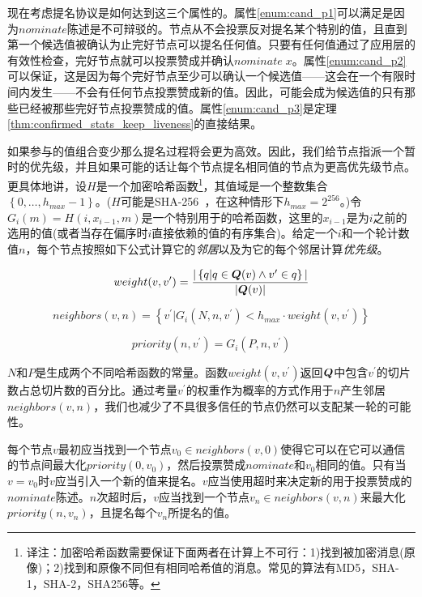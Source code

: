 现在考虑提名协议是如何达到这三个属性的。属性\ref{enum:cand_p1}可以满足是因为$nominate$陈述是不可辩驳的。节点从不会投票反对提名某个特别的值，且直到第一个候选值被确认为止完好节点可以提名任何值。只要有任何值通过了应用层的有效性检查，完好节点就可以投票赞成并确认$nominate\;x$。属性\ref{enum:cand_p2}可以保证，这是因为每个完好节点至少可以确认一个候选值——这会在一个有限时间内发生——不会有任何节点投票赞成新的值。因此，可能会成为候选值的只有那些已经被那些完好节点投票赞成的值。属性\ref{enum:cand_p3}是定理\ref{thm:confirmed_stats_keep_liveness}的直接结果。

如果参与的值组合变少那么提名过程将会更为高效。因此，我们给节点指派一个暂时的优先级，并且如果可能的话让每个节点提名相同值的节点为更高优先级节点。更具体地讲，设$H$是一个加密哈希函数{\footnote{译注：加密哈希函数需要保证下面两者在计算上不可行：1)找到被加密消息(原像)；2)找到和原像不同但有相同哈希值的消息。常见的算法有MD5，SHA-1，SHA-2，SHA256等。}}，其值域是一个整数集合$\left\{0,\dots,h_{max}-1\right\}$。($H$可能是SHA-256~\cite{shs2015}，在这种情形下$h_{max}=2^{256}$。)令$G_i(m)=H(i, x_{i-1},m)$是一个特别用于{\slot}的哈希函数，这里的$x_{i-1}$是为$i$之前的{\slot}选用的值(或者当{\slot}存在偏序时{\slot}$i$直接依赖的值的有序集合)。给定一个{\slot}$i$和一个轮计数值$n$，每个节点按照如下公式计算它的\textit{邻居}以及为它的每个邻居计算\textit{优先级}。

\begin{equation*}
	weight(v,v^{\prime}) = \frac{|\left\{q|q\in{\bm Q}(v)\wedge v^{\prime}\in q\right\}|}{|{\bm Q}(v)|}
\end{equation*}

\begin{equation*}
	neighbors(v,n) = \left\{v^{\prime}|G_i(N,n,v^{\prime})<h_{max}\cdot weight(v,v^{\prime})\right\}
\end{equation*}

\begin{equation*}
	priority(n,v^{\prime}) = G_i(P,n,v^{\prime})
\end{equation*}

$N$和$P$是生成两个不同哈希函数的常量。函数$weight(v,v^{\prime})$返回${\bm Q}$中包含$v^{\prime}$的切片数占总切片数的百分比。通过考量$v^{\prime}$的权重作为概率的方式作用于$n$产生邻居$neighbors(v,n)$，我们也减少了不具很多信任的节点仍然可以支配某一轮的可能性。

每个节点$v$最初应当找到一个节点$v_0\in neighbors(v,0)$使得它可以在它可以通信的节点间最大化$priority(0,v_0)$，然后投票赞成$nominate$和$v_0$相同的值。只有当$v=v_0$时$v$应当引入一个新的值来提名。$v$应当使用超时来决定新的用于投票赞成的$nominate$陈述。$n$次超时后，$v$应当找到一个节点$v_n\in neighbors(v,n)$来最大化$priority(n,v_n)$，且提名每个$v_n$所提名的值。


